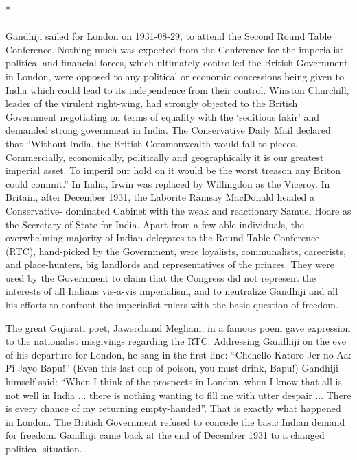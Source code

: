 \begin{multicols}{2}
\begin{center}*\end{center}

\paragraph*{}
Gandhiji sailed for London on 1931-08-29, to attend the Second Round Table Conference. Nothing much was expected from the Conference for the imperialist political and financial forces, which ultimately controlled the British Government in London, were opposed to any political or economic concessions being given to India which could lead to its independence from their control. Winston Churchill, leader of the virulent right-wing, had strongly objected to the British Government negotiating on terms of equality with the `seditious fakir' and demanded strong government in India. The Conservative Daily Mail declared that ``Without India, the British Commonwealth would fall to pieces. Commercially, economically, politically and geographically it is our greatest imperial asset. To imperil our hold on it would be the worst treason any Briton could commit.'' In India, Irwin was replaced by Willingdon as the Viceroy. In Britain, after December 1931, the Laborite Ramsay MacDonald headed a Conservative- dominated Cabinet with the weak and reactionary Samuel Hoare as the Secretary of State for India. Apart from a few able individuals, the overwhelming majority of Indian delegates to the Round Table Conference (RTC), hand-picked by the Government, were loyalists, communalists, careerists, and place-hunters, big landlords and representatives of the princes. They were used by the Government to claim that the Congress did not represent the interests of all Indians vis-a-vis imperialism, and to neutralize Gandhiji and all his efforts to confront the imperialist rulers with the basic question of freedom.

The great Gujarati poet, Jawerchand Meghani, in a famous poem gave expression to the nationalist misgivings regarding the RTC. Addressing Gandhiji on the eve of his departure for London, he sang in the first line: ``Chchello Katoro Jer no Aa: Pi Jayo Bapu!'' (Even this last cup of poison, you must drink, Bapu!) Gandhiji himself said: ``When I think of the prospects in London, when I know that all is not well in India ... there is nothing wanting to fill me with utter despair ... There is every chance of my returning empty-handed''. That is exactly what happened in London. The British Government refused to concede the basic Indian demand for freedom. Gandhiji came back at the end of December 1931 to a changed political situation.


\end{multicols}
